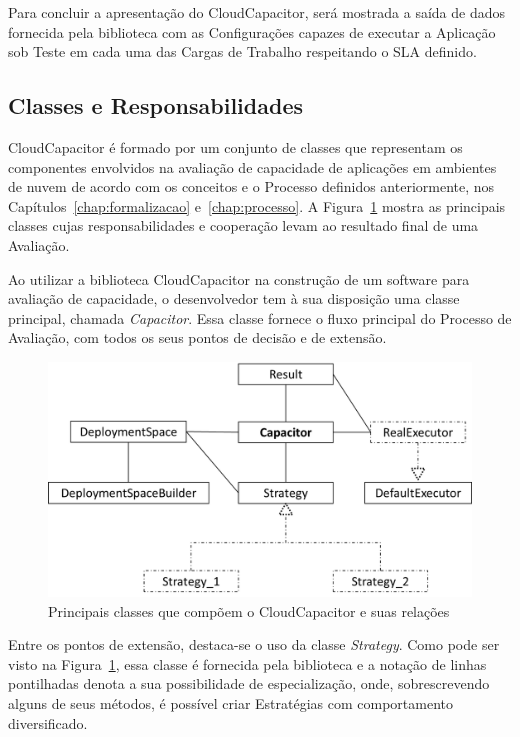 Para concluir a apresentação do CloudCapacitor, será mostrada a saída de dados
fornecida pela biblioteca com as Configurações capazes de executar a
Aplicação sob Teste em cada uma das Cargas de Trabalho respeitando o SLA definido.

\subsection{Classes e Responsabilidades}
\label{subsec:classes}
CloudCapacitor é formado por um conjunto de classes que representam os
componentes envolvidos na avaliação de capacidade de aplicações em ambientes de
nuvem de acordo com os conceitos e o Processo definidos anteriormente, nos
Capítulos~\ref{chap:formalizacao} e~\ref{chap:processo}. A Figura~\ref{fig:classes}
mostra as principais classes cujas responsabilidades e cooperação levam ao 
resultado final de uma Avaliação. 

Ao utilizar a biblioteca CloudCapacitor na construção de um software para avaliação
de capacidade, o desenvolvedor tem à sua disposição uma classe principal, chamada
\emph{Capacitor}. Essa classe fornece o fluxo principal do Processo de
Avaliação, com todos os seus pontos de decisão e de extensão.

\begin{figure}[htb]
  \caption{\label{fig:classes}Principais classes que compõem o CloudCapacitor e suas relações}
  \begin{center}
    \includegraphics[scale=0.75]{img/CapacitorClasses}
  \end{center}
\end{figure}

Entre os pontos de extensão, destaca-se o uso da classe \emph{Strategy}. Como 
pode ser visto na Figura~\ref{fig:classes}, essa classe é fornecida pela biblioteca e a
notação de linhas pontilhadas denota a sua possibilidade de especialização, onde,
sobrescrevendo alguns de seus métodos, é possível criar Estratégias com comportamento
diversificado.

